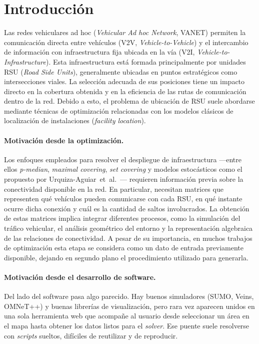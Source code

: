\documentclass[smartcities,article,submit,oneauthor]{Definitions/mdpi}
\begin{document}
\section{Introducción}

Las redes vehiculares ad hoc (\emph{Vehicular Ad hoc Network}, VANET) permiten la
comunicación directa entre vehículos (V2V, \emph{Vehicle-to-Vehicle}) y el intercambio
de información con infraestructura fija ubicada en la vía (V2I,
\emph{Vehicle-to-Infrastructure}). Esta infraestructura está formada principalmente
por unidades RSU (\emph{Road Side Units}), generalmente ubicadas en puntos
estratégicos como intersecciones viales. La selección adecuada de sus posiciones
tiene un impacto directo en la cobertura obtenida y en la eficiencia de las rutas de
comunicación dentro de la red. Debido a esto, el problema de ubicación de RSU suele
abordarse mediante técnicas de optimización relacionadas con los modelos clásicos de
localización de instalaciones (\emph{facility location}).

\paragraph{Motivación desde la optimización.} Los enfoques empleados para resolver
el despliegue de infraestructura ---entre ellos \emph{p-median}, \emph{maximal
covering}, \emph{set covering} y modelos estocásticos como el propuesto por
Urquiza-Aguiar~et~al.~\citep{ref-urquiza}--- requieren información previa sobre la
conectividad disponible en la red. En particular, necesitan matrices que representen
qué vehículos pueden comunicarse con cada RSU, en qué instante ocurre dicha conexión
y cuál es la cantidad de saltos involucrados. La obtención de estas matrices implica
integrar diferentes procesos, como la simulación del tráfico vehicular, el análisis
geométrico del entorno y la representación algebraica de las relaciones de
conectividad. A pesar de su importancia, en muchos trabajos de optimización esta
etapa se considera como un dato de entrada previamente disponible, dejando en segundo
plano el procedimiento utilizado para generarla.

\paragraph{Motivación desde el desarrollo de software.} Del lado del software pasa
algo parecido. Hay buenos simuladores (SUMO, Veins, OMNeT++) y buenas librerías de
visualización, pero rara vez aparecen unidos en una sola herramienta web que
acompañe al usuario desde seleccionar un área en el mapa hasta obtener los datos
listos para el \emph{solver}. Ese puente suele resolverse con \emph{scripts}
sueltos, difíciles de reutilizar y de reproducir.
\end{document}
